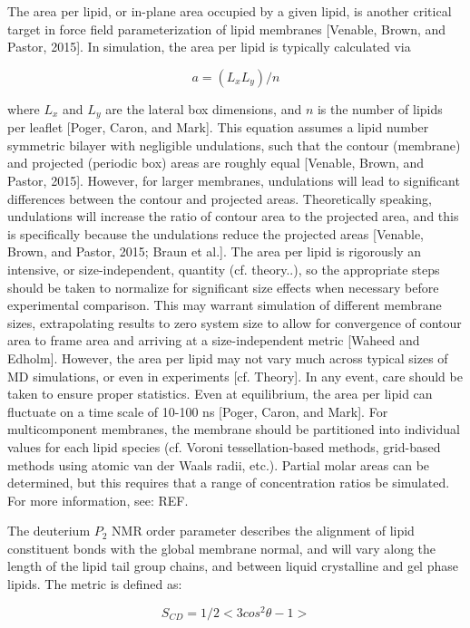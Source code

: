 \documentclass[9pt,bestpractices]{livecoms}
\begin{document}
The area per lipid, or in-plane area occupied by a given lipid, is another critical target in force field parameterization of lipid membranes [Venable, Brown, and Pastor, 2015].
In simulation, the area per lipid is typically calculated via

\begin{equation}
	\label{e:partition}
	a=(L_x L_y)/n
\end{equation}

where $L_x$ and $L_y$ are the lateral box dimensions, and $n$ is the number of lipids per leaflet [Poger, Caron, and Mark].
This equation assumes a lipid number symmetric bilayer with negligible undulations, such that the contour (membrane) and projected (periodic box) areas are roughly equal [Venable, Brown, and Pastor, 2015].
However, for larger membranes, undulations will lead to significant differences between the contour and projected areas.
Theoretically speaking, undulations will increase the ratio of contour area to the projected area, and this is specifically because the undulations reduce the projected areas [Venable, Brown, and Pastor, 2015; Braun et al.].
The area per lipid is rigorously an intensive, or size-independent, quantity (cf. theory..), so the appropriate steps should be taken to normalize for significant size effects when necessary before experimental comparison.
This may warrant simulation of different membrane sizes, extrapolating results to zero system size to allow for convergence of contour area to frame area and arriving at a size-independent metric [Waheed and Edholm].
However, the area per lipid may not vary much across typical sizes of MD simulations, or even in experiments [cf. Theory].
In any event, care should be taken to ensure proper statistics.
Even at equilibrium, the area per lipid can fluctuate on a time scale of 10-100 ns [Poger, Caron, and Mark].
For multicomponent membranes, the membrane should be partitioned into individual values for each lipid species (cf. Voroni tessellation-based methods, grid-based methods using atomic van der Waals radii, etc.).
Partial molar areas can be determined, but this requires that a range of concentration ratios be simulated.
For more information, see: REF.

The deuterium $P_2$ NMR order parameter describes the alignment of lipid constituent bonds with the global membrane normal, and will vary along the length of the lipid tail group chains, and between liquid crystalline and gel phase lipids.
The metric is defined as:

\begin{equation}
	\label{e:partition}
	S_{CD}=1/2<3cos^2\theta-1>
\end{equation}
\end{document}
